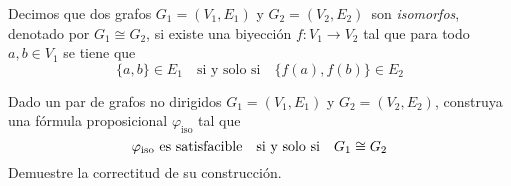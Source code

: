 Decimos que dos grafos $G_1 = (V_1, E_1)$ y $G_2 =
(V_2, E_2)$\ son {\em isomorfos}, denotado por $G_1\cong G_2$, si existe una biyección $f : V_1
\rightarrow V_2$ tal que para todo $a,b\in V_1$ se tiene que
$$\{a,b\} \in E_1\quad\text{si y solo si}\quad\{f(a), f(b)\} \in E_2$$ 

Dado un par de grafos no dirigidos $G_1=(V_1,E_1)$ y $G_2=(V_2,E_2)$, construya una fórmula proposicional $\varphi_\text{iso}$ tal que 
$$\varphi_\text{iso}\text{ es satisfacible\quad si y solo si}\quad G_1\cong G_2$$
Demuestre la correctitud de su construcción.